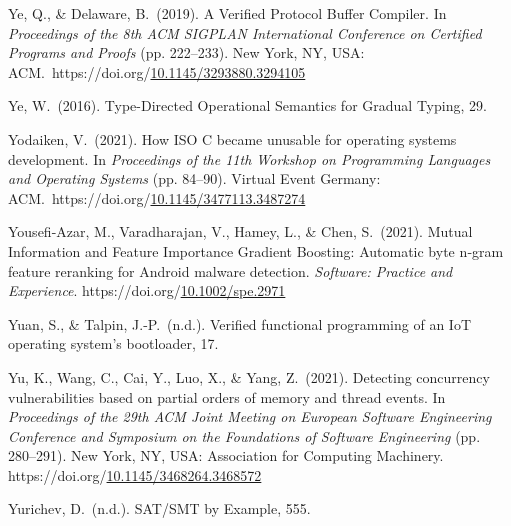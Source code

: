 \documentclass[12pt,twoside]{article}
\begin{document}
{\begin{thebibliography}{1079}
\mdbibitemlabel{}Ye, Q., \& Delaware, B.~(2019). A Verified Protocol Buffer Compiler. In \emph{Proceedings of the 8th ACM SIGPLAN International Conference on Certified Programs and Proofs} (pp. 222–233). New York, NY, USA: ACM.~https://doi.org/\href{https://dx.doi.org/10.1145/3293880.3294105}{10.1145/3293880.3294105}%

\mdbibitemlabel{}Ye, W.~(2016). Type-Directed Operational Semantics for Gradual Typing, 29.%

\mdbibitemlabel{}Yodaiken, V.~(2021). How ISO C became unusable for operating systems development. In \emph{Proceedings of the 11th Workshop on Programming Languages and Operating Systems} (pp. 84–90). Virtual Event Germany: ACM.~https://doi.org/\href{https://dx.doi.org/10.1145/3477113.3487274}{10.1145/3477113.3487274}%

\mdbibitemlabel{}Yousefi-Azar, M., Varadharajan, V., Hamey, L., \& Chen, S.~(2021). Mutual Information and Feature Importance Gradient Boosting: Automatic byte n‐gram feature reranking for Android malware detection. \emph{Software: Practice and Experience}. https://doi.org/\href{https://dx.doi.org/10.1002/spe.2971}{10.1002/spe.2971}%

\mdbibitemlabel{}Yuan, S., \& Talpin, J.-P.~(n.d.). Verified functional programming of an IoT operating system’s bootloader, 17.%

\mdbibitemlabel{}Yu, K., Wang, C., Cai, Y., Luo, X., \& Yang, Z.~(2021). Detecting concurrency vulnerabilities based on partial orders of memory and thread events. In \emph{Proceedings of the 29th ACM Joint Meeting on European Software Engineering Conference and Symposium on the Foundations of Software Engineering} (pp. 280–291). New York, NY, USA: Association for Computing Machinery. https://doi.org/\href{https://dx.doi.org/10.1145/3468264.3468572}{10.1145/3468264.3468572}%

\mdbibitemlabel{}Yurichev, D.~(n.d.). SAT/SMT by Example, 555.%


\end{thebibliography}}
\end{document}
